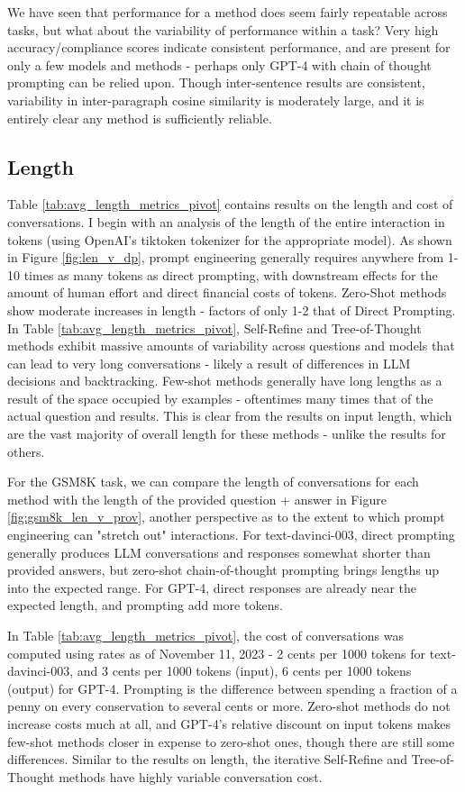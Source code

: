 \documentclass[11pt]{article}
\begin{document}
We have seen that performance for a method does seem fairly repeatable across tasks, but what about the variability of performance within a task? Very high accuracy/compliance scores indicate consistent performance, and are present for only a few models and methods - perhaps only GPT-4 with chain of thought prompting can be relied upon. Though inter-sentence results are consistent, variability in inter-paragraph cosine similarity is moderately large, and it is entirely clear any method is sufficiently reliable.

\subsection*{Length}

Table \ref{tab:avg_length_metrics_pivot} contains results on the length and cost of conversations. I begin with an analysis of the length of the entire interaction in tokens (using OpenAI's tiktoken tokenizer for the appropriate model). As shown in Figure \ref{fig:len_v_dp}, prompt engineering generally requires anywhere from 1-10 times as many tokens as direct prompting, with downstream effects for the amount of human effort and direct financial costs of tokens. Zero-Shot methods show moderate increases in length - factors of only 1-2 that of Direct Prompting. In Table \ref{tab:avg_length_metrics_pivot}, Self-Refine and Tree-of-Thought methods exhibit massive amounts of variability across questions and models that can lead to very long conversations - likely a result of differences in LLM decisions and backtracking. Few-shot methods generally have long lengths as a result of the space occupied by examples - oftentimes many times that of the actual question and results. This is clear from the results on input length, which are the vast majority of overall length for these methods - unlike the results for others.

For the GSM8K task, we can compare the length of conversations for each method with the length of the provided question + answer in Figure \ref{fig:gsm8k_len_v_prov}, another perspective as to the extent to which prompt engineering can "stretch out" interactions. For text-davinci-003, direct prompting generally produces LLM conversations and responses somewhat shorter than provided answers, but zero-shot chain-of-thought prompting brings lengths up into the expected range. For GPT-4, direct responses are already near the expected length, and prompting add more tokens.

In Table \ref{tab:avg_length_metrics_pivot}, the cost of conversations was computed using rates as of November 11, 2023 - 2 cents per 1000 tokens for text-davinci-003, and 3 cents per 1000 tokens (input), 6 cents per 1000 tokens (output) for GPT-4. Prompting is the difference between spending a fraction of a penny on every conservation to several cents or more. Zero-shot methods do not increase costs much at all, and GPT-4's relative discount on input tokens makes few-shot methods closer in expense to zero-shot ones, though there are still some differences. Similar to the results on length, the iterative Self-Refine and Tree-of-Thought methods have highly variable conversation cost.
\end{document}

